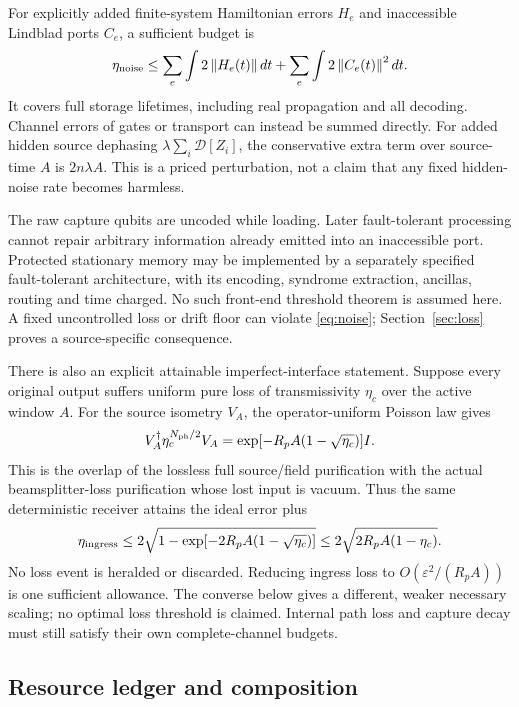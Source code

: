 \documentclass[11pt,a4paper]{article}
\newcommand{\norm}[1]{\left\lVert #1\right\rVert}\newcommand{\ket}[1]{\lvert #1\rangle}\newcommand{\bra}[1]{\langle #1\rvert}
\begin{document}
For explicitly added finite-system Hamiltonian errors $H_e$ and inaccessible Lindblad ports $C_e$, a sufficient budget is
\begin{equation}
 \eta_{\rm noise}\le\sum_e\int2\norm{H_e(t)}dt
                  +\sum_e\int2\norm{C_e(t)}^2dt.
 \label{eq:noise}
\end{equation}
It covers full storage lifetimes, including real propagation and all decoding. Channel errors of gates or transport can instead be summed directly. For added hidden source dephasing $\lambda\sum_i\mathcal D[Z_i]$, the conservative extra term over source-time $A$ is $2n\lambda A$. This is a priced perturbation, not a claim that any fixed hidden-noise rate becomes harmless.

The raw capture qubits are uncoded while loading. Later fault-tolerant processing cannot repair arbitrary information already emitted into an inaccessible port. Protected stationary memory may be implemented by a separately specified fault-tolerant architecture, with its encoding, syndrome extraction, ancillas, routing and time charged. No such front-end threshold theorem is assumed here. A fixed uncontrolled loss or drift floor can violate \eqref{eq:noise}; Section~\ref{sec:loss} proves a source-specific consequence.

There is also an explicit attainable imperfect-interface statement. Suppose every original output suffers uniform pure loss of transmissivity $\eta_c$ over the active window $A$. For the source isometry $V_A$, the operator-uniform Poisson law gives
\begin{equation}
 V_A^\dagger\eta_c^{N_{\rm ph}/2}V_A
 =\exp[-R_pA(1-\sqrt{\eta_c})]I.
\end{equation}
This is the overlap of the lossless full source/field purification with the actual beamsplitter-loss purification whose lost input is vacuum. Thus the same deterministic receiver attains the ideal error plus
\begin{equation}
 \eta_{\rm ingress}\le
 2\sqrt{1-\exp[-2R_pA(1-\sqrt{\eta_c})]}
 \le2\sqrt{2R_pA(1-\eta_c)}.
 \label{eq:lossattain}
\end{equation}
No loss event is heralded or discarded. Reducing ingress loss to $O(\varepsilon^2/(R_pA))$ is one sufficient allowance. The converse below gives a different, weaker necessary scaling; no optimal loss threshold is claimed. Internal path loss and capture decay must still satisfy their own complete-channel budgets.

\subsection{Resource ledger and composition}
\end{document}
